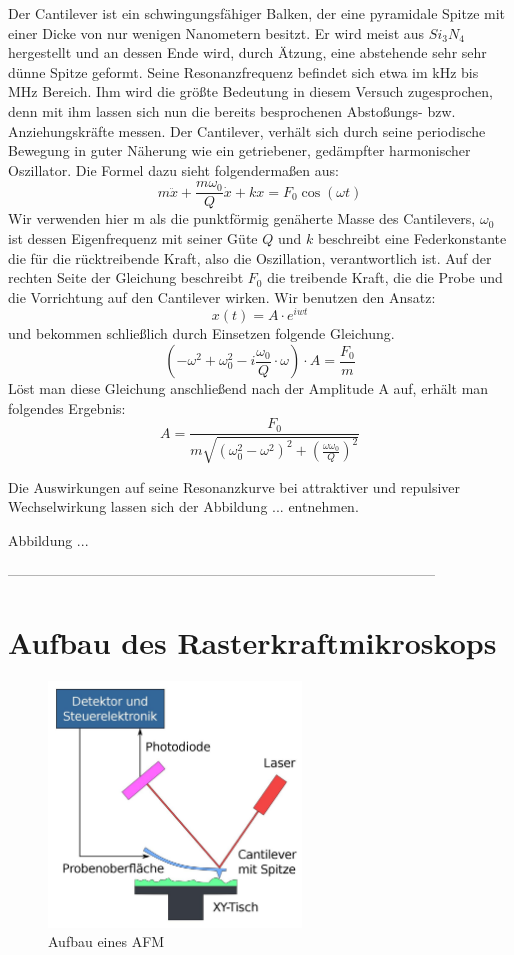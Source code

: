  
Der Cantilever ist ein schwingungsfähiger Balken, der eine pyramidale Spitze mit einer Dicke von nur wenigen Nanometern besitzt.
Er wird meist aus $Si_3N_4$ hergestellt und an dessen Ende wird, durch Ätzung, eine abstehende sehr sehr dünne Spitze geformt.
Seine Resonanzfrequenz befindet sich etwa im kHz bis MHz Bereich.
Ihm wird die größte Bedeutung in diesem Versuch zugesprochen, denn mit ihm lassen sich nun die bereits besprochenen Abstoßungs- bzw. Anziehungskräfte messen.
Der Cantilever, verhält sich durch seine periodische Bewegung in guter Näherung wie ein getriebener, gedämpfter harmonischer Oszillator. 
Die Formel dazu sieht folgendermaßen aus:
\[
    m \ddot{x} + \frac{m \omega_0}{Q} \dot{x} + kx = F_0 \cos(\omega t)
\]
Wir verwenden hier m als die punktförmig genäherte Masse des Cantilevers, $\omega_0$ ist dessen Eigenfrequenz mit seiner Güte $Q$ und $k$ beschreibt eine Federkonstante die für die rücktreibende Kraft, also die Oszillation, verantwortlich ist.
Auf der rechten Seite der Gleichung beschreibt $F_0$ die treibende Kraft, die die Probe und die Vorrichtung auf den Cantilever wirken.
Wir benutzen den Ansatz:
\[
    x(t)=A \cdot e^{iwt}
\]
und bekommen schließlich durch Einsetzen folgende Gleichung.
\[
   \left(-\omega^2+\omega_0^2-i\frac{\omega_0}{Q} \cdot \omega \right) \cdot A 
   = \frac{F_0}{m}
\]
Löst man diese Gleichung anschließend nach der Amplitude A auf, erhält man 
folgendes Ergebnis:
\[
    A = \frac{F_0}{m \sqrt{ ( \omega_0^2 - \omega^2 )^2 + \left( \frac{\omega 
        \omega_0}{Q} \right)^2}}
\]

Die Auswirkungen auf seine Resonanzkurve bei attraktiver und repulsiver Wechselwirkung lassen sich der Abbildung ... entnehmen.

Abbildung ...

--------------------------------------------------------------------------------------------



       
 \section{Aufbau des Rasterkraftmikroskops}
\begin{figure}[h!]
    \centering
    \includegraphics[width=0.6\textwidth]{Abb/afm.jpg}
    \caption{Aufbau eines AFM}
    \label{afm}
\end{figure}

